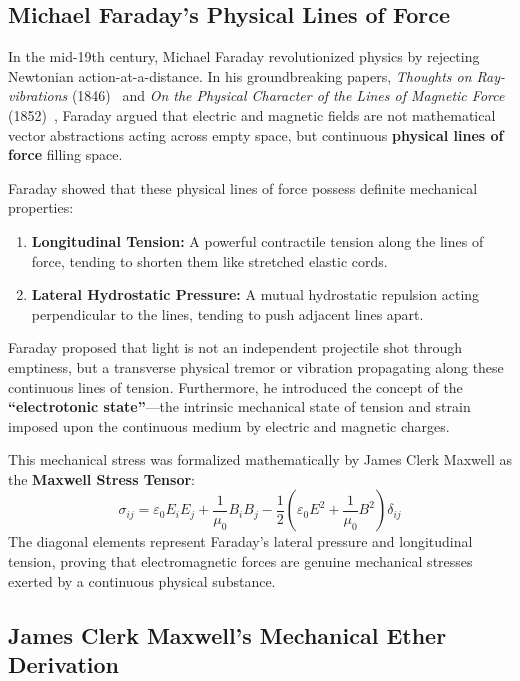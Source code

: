 \documentclass[11pt,a4paper]{article}
\begin{document}
\subsection{Michael Faraday's Physical Lines of Force}
\label{subsec:faraday_lines}

In the mid-19th century, Michael Faraday revolutionized physics by rejecting Newtonian action-at-a-distance. In his groundbreaking papers, \textit{Thoughts on Ray-vibrations} (1846)~\cite{Faraday1846} and \textit{On the Physical Character of the Lines of Magnetic Force} (1852)~\cite{Faraday1852}, Faraday argued that electric and magnetic fields are not mathematical vector abstractions acting across empty space, but continuous \textbf{physical lines of force} filling space.

Faraday showed that these physical lines of force possess definite mechanical properties:
\begin{enumerate}
    \item \textbf{Longitudinal Tension:} A powerful contractile tension along the lines of force, tending to shorten them like stretched elastic cords.
    \item \textbf{Lateral Hydrostatic Pressure:} A mutual hydrostatic repulsion acting perpendicular to the lines, tending to push adjacent lines apart.
\end{enumerate}

Faraday proposed that light is not an independent projectile shot through emptiness, but a transverse physical tremor or vibration propagating along these continuous lines of tension. Furthermore, he introduced the concept of the \textbf{``electrotonic state''}---the intrinsic mechanical state of tension and strain imposed upon the continuous medium by electric and magnetic charges.

This mechanical stress was formalized mathematically by James Clerk Maxwell as the \textbf{Maxwell Stress Tensor}:
\begin{equation}
\sigma_{ij} = \varepsilon_0 E_i E_j + \frac{1}{\mu_0} B_i B_j - \frac{1}{2} \left( \varepsilon_0 E^2 + \frac{1}{\mu_0} B^2 \right) \delta_{ij}
\label{eq:maxwell_stress_tensor}
\end{equation}
The diagonal elements represent Faraday's lateral pressure and longitudinal tension, proving that electromagnetic forces are genuine mechanical stresses exerted by a continuous physical substance.

\subsection{James Clerk Maxwell's Mechanical Ether Derivation}
\label{subsec:maxwell_ether}
\end{document}
